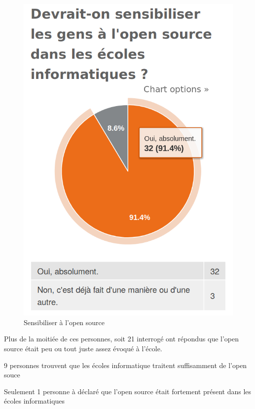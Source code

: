 			\begin{figure}[h]
				\center
				\includegraphics[scale=0.28]{./img/a6}
				\caption{Sensibiliser à l'open source}
			\end{figure}

			\newpage

			Plus de la moitiée de ces personnes, soit 21 interrogé ont répondus que l'open source était peu ou tout juste assez évoqué à l'école.

			9 personnes trouvent que les écoles informatique traitent suffisamment de l'open souce

			Seulement 1 personne à déclaré que l'open source était fortement présent dans les écoles informatiques

